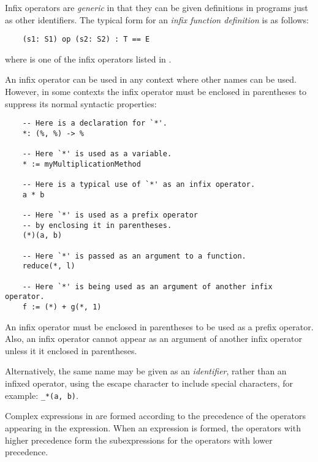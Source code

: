 Infix operators are {\em generic\/} in that they can be given definitions
in \asharp{} programs just as other identifiers.  The typical form for an
{\em infix function definition} is as follows:

\begin{small}
\begin{verbatim}
    (s1: S1) op (s2: S2) : T == E
\end{verbatim}
\end{small}

where  is one of the infix operators listed in .

An infix operator can be used in any context where other names can be used.
However, in some contexts the infix operator must be enclosed in parentheses
to suppress its normal syntactic properties:

\begin{small}
\begin{verbatim}
    -- Here is a declaration for `*'.
    *: (%, %) -> %

    -- Here `*' is used as a variable.
    * := myMultiplicationMethod

    -- Here is a typical use of `*' as an infix operator.
    a * b

    -- Here `*' is used as a prefix operator
    -- by enclosing it in parentheses.
    (*)(a, b)

    -- Here `*' is passed as an argument to a function.
    reduce(*, l)

    -- Here `*' is being used as an argument of another infix operator.
    f := (*) + g(*, 1)
\end{verbatim}
\end{small}

An infix operator must be enclosed in parentheses to be used as a prefix
operator.  Also, an infix operator cannot appear as an argument of another
infix operator unless it it enclosed in parentheses.

Alternatively, the same name may be given as an {\em identifier\/},
rather than an infixed operator, using the escape character
to include special characters, for example: \verb^_*(a, b)^.


Complex expressions in \asharp{} are formed according to the precedence
of the operators appearing in the expression.  When an expression is
formed, the operators with higher precedence form the subexpressions for
the operators with lower precedence.

